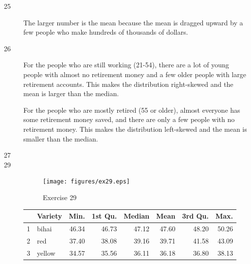 \documentclass{exam}
\begin{document}
  \ifprintanswers
    \begin{description}
      \item[25] The larger number is the mean because the mean is dragged upward by a few
        people who make hundreds of thousands of dollars.

      \item[26] 
        For the people who are still working (21-54), there are a lot of young people with
        almost no retirement money and a few older people with large retirement accounts.
        This makes the distribution right-skewed and the mean is larger than the median.

        For the people who are mostly retired (55 or older), almost everyone has some
        retirement money saved, and there are only a few people with no retirement money.
        This makes the distribution left-skewed and the mean is smaller than the median.

      \item[27] 

      \item[29]
        \begin{figure}[H]
          \centering
          \texttt{[image: figures/ex29.eps]}
          \caption{Exercise 29}
        \end{figure}

        \begin{table}[H]
          \centering
          \begin{tabular}{rlrrrrrr}
            \toprule
              & Variety & Min.  & 1st Qu. & Median & Mean  & 3rd Qu. & Max. \\
            \midrule
            1 & bihai   & 46.34 & 46.73   & 47.12  & 47.60 & 48.20   & 50.26 \\
            2 & red     & 37.40 & 38.08   & 39.16  & 39.71 & 41.58   & 43.09 \\
            3 & yellow  & 34.57 & 35.56   & 36.11  & 36.18 & 36.80   & 38.13 \\
            \bottomrule
          \end{tabular}
        \end{table}


\end{description}
\end{document}
